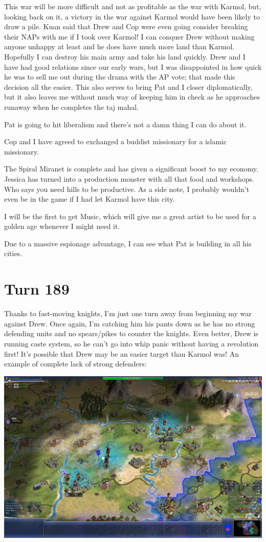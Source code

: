 \documentclass[10pt]{article}
\begin{document}
This war will be more difficult and not as profitable as the war with
Karmol, but, looking back on it, a victory in the war against Karmol
would have been likely to draw a pile. Kuan said that Drew and Cop
were even going consider breaking their NAPs with me if I took over
Karmol! I can conquer Drew without making anyone unhappy at least and
he does have much more land than Karmol. Hopefully I can destroy his
main army and take his land quickly. Drew and I have had good
relations since our early wars, but I was disappointed in how quick he
was to sell me out during the drama with the AP vote; that made this
decision all the easier. This also serves to bring Pat and I closer
diplomatically, but it also leaves me without much way of keeping him
in check as he approaches runaway when he completes the taj mahal.

Pat is going to hit liberalism and there's not a damn thing I can do about it.

Cop and I have agreed to exchanged a buddist missionary for a islamic missionary.

The Spiral Miranet is complete and has given a significant boost to my
economy. Jessica has turned into a production monster with all that
food and workshops. Who says you need hills to be productive. As a
side note, I probably wouldn't even be in the game if I had let Karmol
have this city.

I will be the first to get Music, which will give me a great artist to be used for a golden age whenever I might need it.

Due to a massive espionage advantage, I can see what Pat is building in all his cities.

\section*{Turn 189}

Thanks to fast-moving knights, I'm just one turn away from beginning
my war against Drew. Once again, I'm catching him his pants down as he
has no strong defending units and no spears/pikes to counter the
knights. Even better, Drew is running caste system, so he can't go
into whip panic without having a revolution first! It's possible that
Drew may be an easier target than Karmol was! An example of complete
lack of strong defenders:

\includegraphics[width=1.0\textwidth]{turn189}
\end{document}
